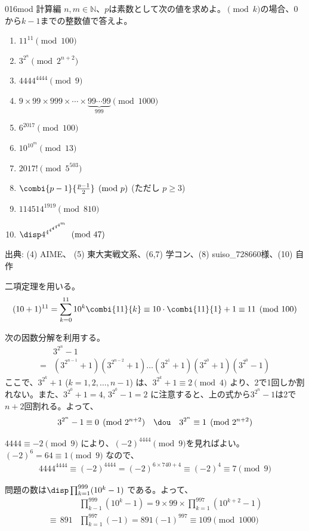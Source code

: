 \begin{prob}{016}{}{mod 計算編}
 $n,m\in\mathbb{N}$、$p$は素数として次の値を求めよ。$\pmod k$の場合、$0$から$k-1$までの整数値で答えよ。
 \begin{enumerate}
  \item $11^{11} \pmod {100}$
  \item $3^{2^n} \pmod {2^{n+2}}$
  \item $4444^{4444} \pmod 9$
  \item $9\times99\times999\times\cdots\times\underbrace{99\cdots99}_{999} \pmod {1000}$
  \item $6^{2017} \pmod {100}$
  \item $10^{10^m} \pmod {13}$
  \item $2017! \pmod 5^{503}$
  \item $\combi{p-1}{\frac{p-1}{2}} \pmod{p}$ (ただし $p\ge 3$)
  \item $114514^{1919} \pmod {810}$
  \item $\disp 4^{4^{4^{4^{4^{4^m}}}}} \pmod {47}$
 \end{enumerate}
 {\small 出典: (4) AIME、 (5) 東大実戦文系、(6,7) 学コン、(8) suiso\_728660様、(10) 自作}
\end{prob}
二項定理を用いる。
\begin{align*}
 (10+1)^{11}=\sum_{k=0}^{11}10^k \combi{11}{k}\equiv 10\cdot\combi{11}{1}+1\equiv 11 \pmod{100}
\end{align*}

次の因数分解を利用する。
\begin{align*}
 &3^{2^n}-1 \\
=&\left(3^{2^{n-1}}+1\right)\left(3^{2^{n-2}}+1\right)\dots\left(3^{2^1}+1\right)\left(3^{2^0}+1\right)\left(3^{2^0}-1\right)
\end{align*}
ここで、$3^{2^k}+1$ ($k=1, 2, \dots , n-1$) は、$3^{2^k}+1\equiv 2 \pmod{4}$ より、2で1回しか割れない。また、$3^{2^0}+1=4$, $3^{2^0}-1=2$ に注意すると、上の式から$3^{2^n}-1$は2で$n+2$回割れる。よって、
\[ 3^{2^n}-1\equiv 0 \pmod{2^{n+2}} \quad\dou\quad 3^{2^n}\equiv 1 \pmod{2^{n+2}} \]

$4444\equiv -2 \pmod{9}$ により、$(-2)^{4444} \pmod{9}$を見ればよい。$(-2)^6=64\equiv 1 \pmod{9}$ なので、
\begin{align*}
 4444^{4444}\equiv (-2)^{4444}=(-2)^{6\times 740+4}\!\equiv (-2)^4\equiv 7 \pmod{9}
\end{align*}

問題の数は$\disp \prod_{k=1}^{999} (10^k-1)$ である。よって、
\begin{align*}
 &\prod_{k-1}^{999}(10^k-1)=9\times 99\times \prod_{k=1}^{997}(10^{k+2}-1) \\
 \equiv \, 891&\prod_{k=1}^{997}(-1)=891(-1)^{997}\equiv 109 \pmod{1000}
\end{align*}

